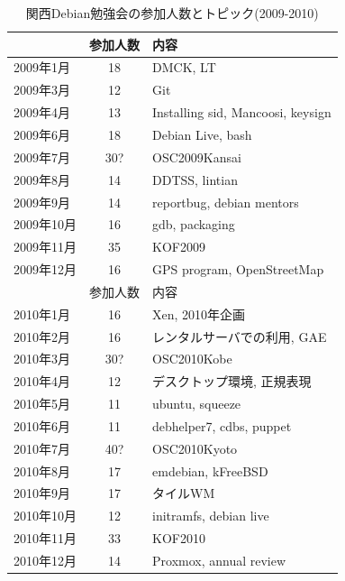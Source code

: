 \documentclass[mingoth,a4paper]{jsarticle}
\begin{document}
\begin{table}
\begin{minipage}{.5\linewidth}
  \begin{center}
    \caption{関西Debian勉強会の参加人数とトピック(2009-2010)}
    \begin{tabular}{|l|c|p{10em}|}
      \hline
                 & 参加人数 & 内容 \\
      \hline
      2009年1月  & 18       & DMCK, LT \\
      2009年3月  & 12       & Git \\
      2009年4月  & 13       & Installing sid, Mancoosi, keysign \\
      2009年6月  & 18       & Debian Live, bash\\
      2009年7月  & 30?      & OSC2009Kansai \\
      2009年8月  & 14       & DDTSS, lintian \\
      2009年9月  & 14       & reportbug, debian mentors\\
      2009年10月 & 16       & gdb, packaging \\
      2009年11月 & 35       & KOF2009 \\
      2009年12月 & 16       & GPS program, OpenStreetMap \\
      \hline
      \hline
                 & 参加人数 & 内容 \\
      \hline
      2010年1月  & 16       & Xen, 2010年企画 \\
      2010年2月  & 16       & レンタルサーバでの利用, GAE \\
      2010年3月  & 30?      & OSC2010Kobe \\
      2010年4月  & 12       & デスクトップ環境, 正規表現 \\
      2010年5月  & 11       & ubuntu, squeeze \\
      2010年6月  & 11       & debhelper7, cdbs, puppet \\
      2010年7月  & 40?      & OSC2010Kyoto \\
      2010年8月  & 17       & emdebian, kFreeBSD \\
      2010年9月  & 17       & タイルWM \\
      2010年10月 & 12       & initramfs, debian live \\
      2010年11月 & 33       & KOF2010 \\
      2010年12月 & 14       & Proxmox, annual review \\
      \hline
    \end{tabular}
  \end{center}
\end{minipage}
\end{table}
\end{document}
